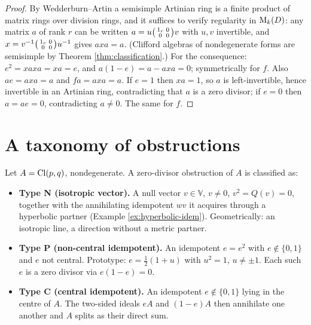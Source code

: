\begin{proof}
By Wedderburn--Artin a semisimple Artinian ring is a finite product of matrix rings over division rings, and it suffices to verify regularity in $\mathrm{M}_k(D)$: any matrix $a$ of rank $r$ can be written $a = u \begin{psmallmatrix} 1_r & 0 \\ 0 & 0\end{psmallmatrix} v$ with $u, v$ invertible, and $x = v^{-1} \begin{psmallmatrix} 1_r & 0 \\ 0 & 0 \end{psmallmatrix} u^{-1}$ gives $axa = a$. (Clifford algebras of nondegenerate forms are semisimple by Theorem \ref{thm:classification}.) For the consequence: $e^2 = xaxa = xa = e$, and $a(1-e) = a - axa = 0$; symmetrically for $f$. Also $ae = axa = a$ and $fa = axa = a$. If $e = 1$ then $xa = 1$, so $a$ is left-invertible, hence invertible in an Artinian ring, contradicting that $a$ is a zero divisor; if $e = 0$ then $a = ae = 0$, contradicting $a \neq 0$. The same for $f$.
\end{proof}

\section{A taxonomy of obstructions}\label{sec:taxonomy}

\begin{definition}\label{def:types}
Let $A = \mathrm{Cl}(p,q)$, nondegenerate. A zero-divisor obstruction of $A$ is classified as:
\begin{itemize}
\item \textbf{Type N (isotropic vector).} A null vector $v \in \mathbb{V}$, $v \neq 0$, $v^2 = Q(v) = 0$, together with the annihilating idempotent $wv$ it acquires through a hyperbolic partner (Example \ref{ex:hyperbolic-idem}). Geometrically: an isotropic line, a direction without a metric partner.
\item \textbf{Type P (non-central idempotent).} An idempotent $e = e^2$ with $e \notin \{0, 1\}$ and $e$ not central. Prototype: $e = \tfrac12(1 + u)$ with $u^2 = 1$, $u \neq \pm 1$. Each such $e$ is a zero divisor via $e(1 - e) = 0$.
\item \textbf{Type C (central idempotent).} An idempotent $e \notin \{0,1\}$ lying in the centre of $A$. The two-sided ideals $eA$ and $(1-e)A$ then annihilate one another and $A$ splits as their direct sum.
\end{itemize}
\end{definition}

